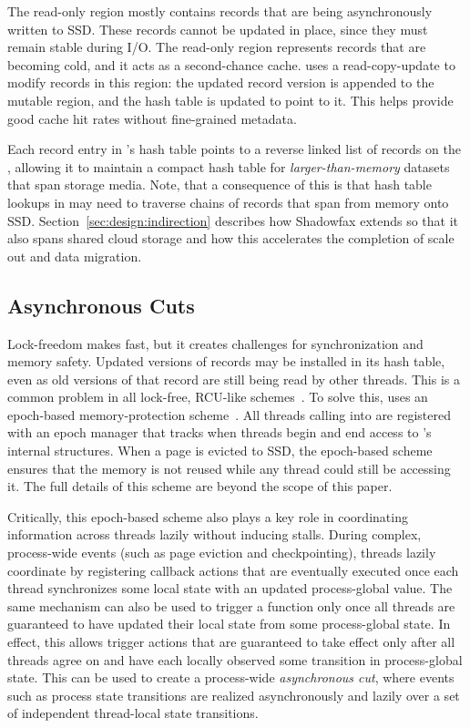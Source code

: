 The read-only region mostly contains records that are being asynchronously
written to SSD.
%
These records cannot be updated in place, since they must remain stable during I/O.
%
The read-only region represents records that are becoming cold, and it acts as
a second-chance cache.
%
\faster uses a read-copy-update to modify records in this region: the updated
record version is appended to the mutable region, and the hash table is updated to
point to it.
%
This helps provide good cache hit rates without fine-grained metadata.

Each record entry in \faster's hash table points to a reverse linked list of
records on the \hlog, allowing it to maintain a compact hash table for
\emph{larger-than-memory} datasets that span storage media.
%
Note, that a consequence of this is that hash table lookups in \faster may need
to traverse chains of records that span from memory onto SSD.
%
Section~\ref{sec:design:indirection} describes how Shadowfax extends \hlog so
that it also spans shared cloud storage and how this accelerates the completion
of scale out and data migration.



\subsection{Asynchronous Cuts}
\label{sec:epochs}

Lock-freedom makes \faster fast, but it creates challenges for synchronization
and memory safety.
%
Updated versions of records may be installed in its hash table, even as old
versions of that record are still being read by other threads.
%
This is a common problem in all lock-free, RCU-like schemes~\cite{rcu}.
%
To solve this, \faster uses an epoch-based memory-protection scheme~\cite{epochs}.
%
All threads calling into \faster are registered with an epoch manager that
tracks when threads begin and end access to \faster's internal structures.
%
When a page is evicted to SSD, the epoch-based scheme ensures that the memory
is not reused while any thread could still be accessing it.
%
The full details of this scheme are beyond the scope of this paper.

Critically, this epoch-based scheme also plays a key role in coordinating
information across threads lazily without inducing stalls.
%
During complex, process-wide events (such as page eviction and checkpointing), threads lazily
coordinate by registering callback actions that are eventually executed once each
thread synchronizes some local state with an updated
process-global value.
%
The same mechanism can also be used to trigger a function only once all threads
are guaranteed to have updated their local state from some process-global state.
%
In effect, this allows trigger actions that are guaranteed to
take effect only after all threads agree on and have each locally
observed some transition in process-global state.
%
This can be used to create a process-wide \emph{asynchronous cut}, where
events such as process state transitions are realized asynchronously and lazily
over a set of independent thread-local state transitions.

